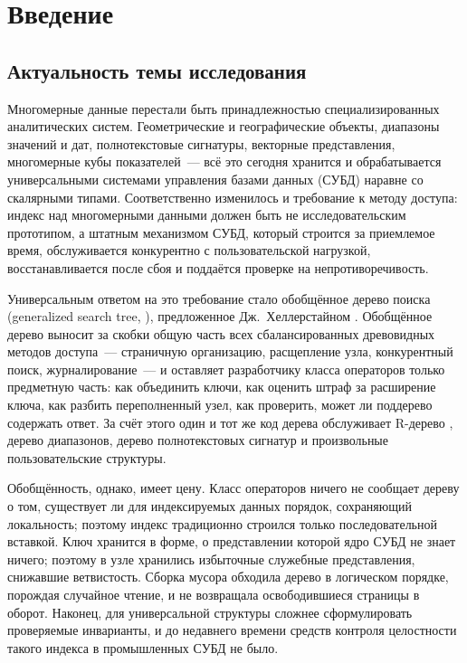 \chapter*{Введение}

\section*{Актуальность темы исследования}

Многомерные данные перестали быть принадлежностью специализированных
аналитических систем. Геометрические и географические объекты, диапазоны
значений и дат, полнотекстовые сигнатуры, векторные представления,
многомерные кубы показателей~--- всё это сегодня хранится и обрабатывается
универсальными системами управления базами данных (СУБД) наравне со скалярными
типами. Соответственно изменилось и требование к методу доступа: индекс над
многомерными данными должен быть не исследовательским прототипом, а штатным
механизмом СУБД, который строится за приемлемое время, обслуживается
конкурентно с пользовательской нагрузкой, восстанавливается после сбоя и
поддаётся проверке на непротиворечивость.

Универсальным ответом на это требование стало обобщённое дерево поиска
(generalized search tree, \gist), предложенное Дж.~Хеллерстайном
\cite{hellerstein1995generalized}. Обобщённое дерево выносит за скобки общую
часть всех сбалансированных древовидных методов доступа~--- страничную
организацию, расщепление узла, конкурентный поиск, журналирование~--- и
оставляет разработчику класса операторов только предметную часть: как объединить
ключи, как оценить штраф за расширение ключа, как разбить переполненный узел,
как проверить, может ли поддерево содержать ответ. За счёт этого один и тот же
код дерева обслуживает R-дерево \cite{guttman1984r}, дерево диапазонов, дерево
полнотекстовых сигнатур и произвольные пользовательские структуры.

Обобщённость, однако, имеет цену. Класс операторов ничего не сообщает дереву о
том, существует ли для индексируемых данных порядок, сохраняющий локальность;
поэтому индекс традиционно строился только последовательной вставкой. Ключ
хранится в форме, о представлении которой ядро СУБД не знает ничего; поэтому в
узле хранились избыточные служебные представления, снижавшие ветвистость.
Сборка мусора обходила дерево в логическом порядке, порождая случайное чтение, и
не возвращала освободившиеся страницы в оборот. Наконец, для универсальной
структуры сложнее сформулировать проверяемые инварианты, и до недавнего времени
средств контроля целостности такого индекса в промышленных СУБД не было.

